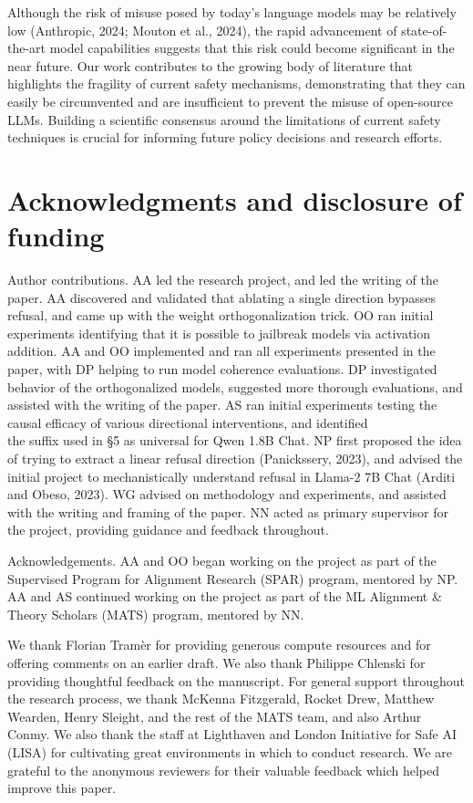 \documentclass[10pt]{article}
\begin{document}
Although the risk of misuse posed by today's language models may be relatively low (Anthropic, 2024; Mouton et al., 2024), the rapid advancement of state-of-the-art model capabilities suggests that this risk could become significant in the near future. Our work contributes to the growing body of literature that highlights the fragility of current safety mechanisms, demonstrating that they can easily be circumvented and are insufficient to prevent the misuse of open-source LLMs. Building a scientific consensus around the limitations of current safety techniques is crucial for informing future policy decisions and research efforts.

\section*{Acknowledgments and disclosure of funding}
Author contributions. AA led the research project, and led the writing of the paper. AA discovered and validated that ablating a single direction bypasses refusal, and came up with the weight orthogonalization trick. OO ran initial experiments identifying that it is possible to jailbreak models via activation addition. AA and OO implemented and ran all experiments presented in the paper, with DP helping to run model coherence evaluations. DP investigated behavior of the orthogonalized models, suggested more thorough evaluations, and assisted with the writing of the paper. AS ran initial experiments testing the causal efficacy of various directional interventions, and identified\\
the suffix used in §5 as universal for Qwen 1.8B Chat. NP first proposed the idea of trying to extract a linear refusal direction (Panickssery, 2023), and advised the initial project to mechanistically understand refusal in Llama-2 7B Chat (Arditi and Obeso, 2023). WG advised on methodology and experiments, and assisted with the writing and framing of the paper. NN acted as primary supervisor for the project, providing guidance and feedback throughout.

Acknowledgements. AA and OO began working on the project as part of the Supervised Program for Alignment Research (SPAR) program, mentored by NP. AA and AS continued working on the project as part of the ML Alignment \& Theory Scholars (MATS) program, mentored by NN.

We thank Florian Tramèr for providing generous compute resources and for offering comments on an earlier draft. We also thank Philippe Chlenski for providing thoughtful feedback on the manuscript. For general support throughout the research process, we thank McKenna Fitzgerald, Rocket Drew, Matthew Wearden, Henry Sleight, and the rest of the MATS team, and also Arthur Conmy. We also thank the staff at Lighthaven and London Initiative for Safe AI (LISA) for cultivating great environments in which to conduct research. We are grateful to the anonymous reviewers for their valuable feedback which helped improve this paper.
\end{document}
